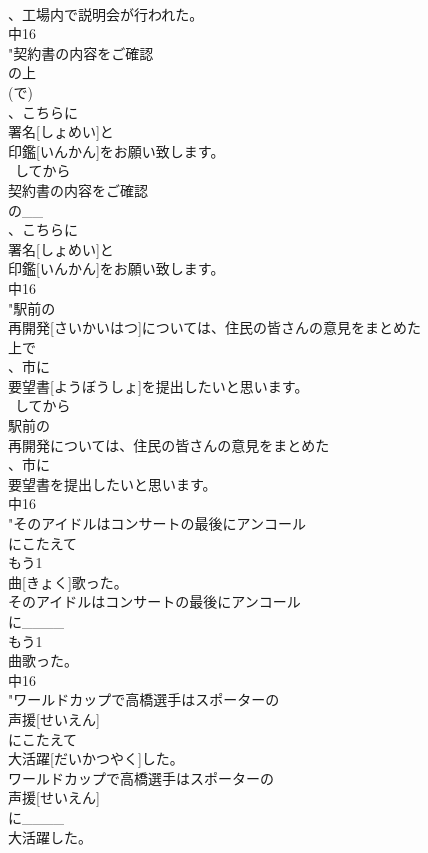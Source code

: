 \documentclass[8pt]{extreport}
\begin{document}
\begin{CJK}{UTF8}{min}
\\	、工場内で説明会が行われた。
\\	中16
\\	"契約書の内容をご確認
\\	の上
\\	(で)
\\	、こちらに
\\	署名[しょめい]と
\\	印鑑[いんかん]をお願い致します。
\\	~してから	
\\	契約書の内容をご確認
\\	の__
\\	、こちらに
\\	署名[しょめい]と
\\	印鑑[いんかん]をお願い致します。
\\	中16
\\	"駅前の
\\	再開発[さいかいはつ]については、住民の皆さんの意見をまとめた
\\	上で
\\	、市に
\\	要望書[ようぼうしょ]を提出したいと思います。
\\	~してから	
\\	駅前の
\\	再開発については、住民の皆さんの意見をまとめた
\\	、市に
\\	要望書を提出したいと思います。
\\	中16
\\	"そのアイドルはコンサートの最後にアンコール
\\	にこたえて
\\	もう1
\\	曲[きょく]歌った。
\\	そのアイドルはコンサートの最後にアンコール
\\	に____
\\	もう1
\\	曲歌った。
\\	中16
\\	"ワールドカップで高橋選手はスポーターの
\\	声援[せいえん]
\\	にこたえて
\\	大活躍[だいかつやく]した。
\\	ワールドカップで高橋選手はスポーターの
\\	声援[せいえん]
\\	に____
\\	大活躍した。

\end{CJK}
\end{document}
